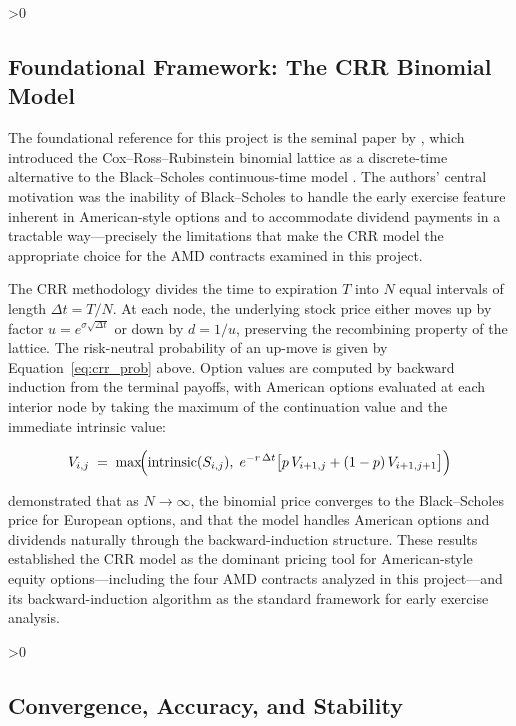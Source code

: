 \documentclass[12pt, letterpaper]{article}
\let\oldsubsection\subsection
\renewcommand{\subsection}{%
  \ifnum\value{subsection}>0 \clearpage\fi
  \oldsubsection
}
\begin{document}
\subsection{Foundational Framework: The CRR Binomial Model}

The foundational reference for this project is the seminal paper by
\citet{Cox1979}, which introduced the Cox--Ross--Rubinstein binomial
lattice as a discrete-time alternative to the Black--Scholes
continuous-time model \citep{BlackScholes1973}. The authors' central
motivation was the inability of Black--Scholes to handle the early
exercise feature inherent in American-style options and to accommodate
dividend payments in a tractable way---precisely the limitations that
make the CRR model the appropriate choice for the AMD contracts
examined in this project.

The CRR methodology divides the time to expiration $T$ into $N$ equal
intervals of length $\Delta t = T/N$. At each node, the underlying
stock price either moves up by factor $u = e^{\sigma\sqrt{\Delta t}}$
or down by $d = 1/u$, preserving the recombining property of the
lattice. The risk-neutral probability of an up-move is given by
Equation~\eqref{eq:crr_prob} above. Option values are computed by
backward induction from the terminal payoffs, with American options
evaluated at each interior node by taking the maximum of the
continuation value and the immediate intrinsic value:

\begin{equation}
  V_{i,j} \;=\; \max\!\Bigl(
    \text{intrinsic}(S_{i,j}),\;
    e^{-r\,\Delta t}\bigl[p\,V_{i+1,j} + (1-p)\,V_{i+1,j+1}\bigr]
  \Bigr)
  \label{eq:backward_induction}
\end{equation}

\citet{Cox1979} demonstrated that as $N \to \infty$, the binomial
price converges to the Black--Scholes price for European options, and
that the model handles American options and dividends naturally through
the backward-induction structure. These results established the CRR
model as the dominant pricing tool for American-style equity
options---including the four AMD contracts analyzed in this
project---and its backward-induction algorithm as the standard
framework for early exercise analysis.

\subsection{Convergence, Accuracy, and Stability}
\end{document}
